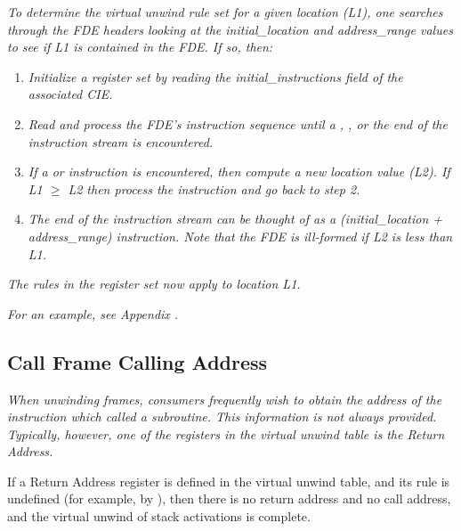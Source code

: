 \textit{To determine the virtual unwind rule set for a given location
(L1), one searches through the FDE headers looking at the
initial\_location and address\_range values to see if L1 is
contained in the FDE. If so, then:}
\begin{enumerate}[1. ]

\item \textit{Initialize a register set by reading the
initial\_instructions field of the associated CIE.}

\item \textit{Read and process the FDE\textquoteright s instruction
sequence until a , 
, or the
end of the instruction stream is encountered.}

\item \textit{ If a  or 
instruction is encountered, then compute a new location value
(L2). If L1 $\geq$ L2 then process the instruction and go back
to step 2.}

\item \textit{ The end of the instruction stream can be thought
of as a  (initial\_location + address\_range)
instruction. Note that the FDE is ill-formed if L2 is less
than L1.}

\end{enumerate}

\textit{The rules in the register set now apply to location L1.}

\textit{For an example, see 
Appendix .}



\subsection{Call Frame Calling Address}
\label{chap:callframecallingaddress}

\textit{When unwinding frames, consumers frequently wish to obtain the
address of the instruction which called a subroutine. This
information is not always provided. Typically, however,
one of the registers in the virtual unwind table is the
Return Address.}

If a Return Address register is defined in the virtual
unwind table, and its rule is undefined (for example, by
), then there is no return address and no
call address, and the virtual unwind of stack activations
is complete.

